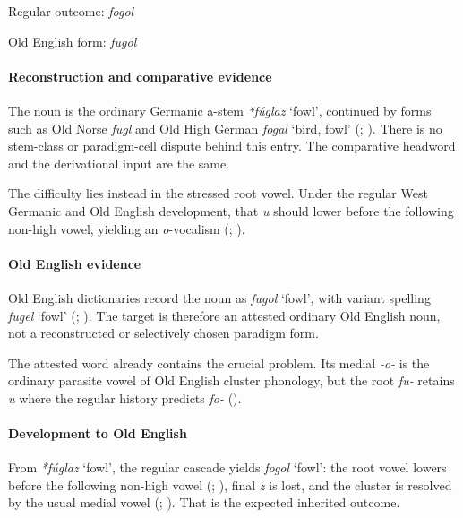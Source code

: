 \documentclass[
  british,
  a4paper,
]{article}
\providecommand{\Recon}[1]{\emph{*#1}}
\begin{document}
Regular outcome: \emph{fogol}

Old English form: \emph{fugol}

\paragraph{Reconstruction and comparative
evidence}\label{reconstruction-and-comparative-evidence-150}

The noun is the ordinary Germanic a-stem \Recon{fúglaz} `fowl',
continued by forms such as Old Norse \emph{fugl} and Old High German
{\emph{fogal}} `bird, fowl' (; ). There is no stem-class
or paradigm-cell dispute behind this entry. The comparative headword and
the derivational input are the same.

The difficulty lies instead in the stressed root vowel. Under the
regular West Germanic and Old English development, that \emph{u} should
lower before the following non-high vowel, yielding an \emph{o}-vocalism
(;
).

\paragraph{Old English evidence}\label{old-english-evidence-150}

Old English dictionaries record the noun as \emph{fugol} `fowl', with
variant spelling \emph{fugel} `fowl'
(;
). The target is
therefore an attested ordinary Old English noun, not a reconstructed or
selectively chosen paradigm form.

The attested word already contains the crucial problem. Its medial
\emph{-o-} is the ordinary parasite vowel of Old English cluster
phonology, but the root \emph{fu-} retains \emph{u} where the regular
history predicts \emph{fo-} ().

\paragraph{Development to Old
English}\label{development-to-old-english-150}

From \Recon{fúglaz} `fowl', the regular cascade yields \emph{fogol}
`fowl': the root vowel lowers before the following non-high vowel
(;
), final \emph{z} is lost,
and the cluster is resolved by the usual medial vowel
(;
). That is the expected
inherited outcome.
\end{document}
